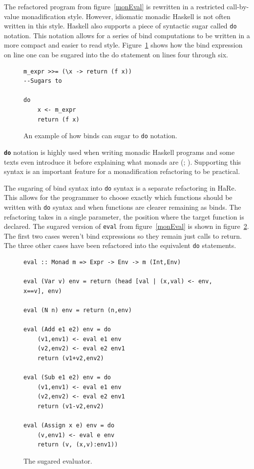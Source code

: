 The refactored program from figure~\ref{monEval} is rewritten in a restricted call-by-value monadification style. However, idiomatic monadic Haskell is not often written in this style. Haskell also supports a piece of syntactic sugar called \texttt{do} notation. This notation allows for a series of bind computations to be written in a more compact and easier to read style. Figure~\ref{doEx} shows how the bind expression on line one can be sugared into the do statement on lines four through six.

\begin{figure}[t]
\begin{lstlisting}
m_expr >>= (\x -> return (f x))
--Sugars to

do
	x <- m_expr
	return (f x)
\end{lstlisting}
\caption{An example of how binds can sugar to \texttt{do} notation.}
\label{doEx}
\end{figure}

\textbf{\texttt{do}} notation is highly used when writing monadic Haskell programs and some texts even introduce it before explaining what monads are (\cite{realWorldHaskell}; \cite{learnYou}). Supporting this syntax is an important feature for a monadification refactoring to be practical. 

The sugaring of bind syntax into \texttt{do} syntax is a separate refactoring in HaRe. This allows for the programmer to choose exactly which functions should be written with \texttt{do} syntax and when functions are clearer remaining as binds. The refactoring takes in a single parameter, the position where the target function is declared. The sugared version of \texttt{eval} from figure~\ref{monEval} is shown in figure~\ref{finEval}. The first two cases weren't bind expressions so they remain just calls to return. The three other cases have been refactored into the equivalent \texttt{do} statements.

\begin{figure}[t]
\begin{lstlisting}
eval :: Monad m => Expr -> Env -> m (Int,Env)

eval (Var v) env = return (head [val | (x,val) <- env, x==v], env)

eval (N n) env = return (n,env)

eval (Add e1 e2) env = do
	(v1,env1) <- eval e1 env
	(v2,env2) <- eval e2 env1
	return (v1+v2,env2)

eval (Sub e1 e2) env = do
	(v1,env1) <- eval e1 env 
	(v2,env2) <- eval e2 env1
	return (v1-v2,env2)

eval (Assign x e) env = do
	(v,env1) <- eval e env
	return (v, (x,v):env1))
\end{lstlisting}
\caption{The sugared evaluator.}
\label{finEval}
\end{figure}

